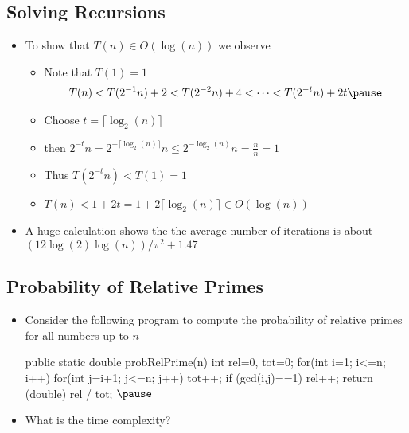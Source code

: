 \begin{slide}
\section[-1]{Solving Recursions}

\begin{PauseHighLight}
  \begin{itemize}
  \item To show that $T(n)\in O(\log(n))$ we observe
    \begin{itemize}
    \item Note that $T(1) = 1$\pause
      \begin{align*}
        T(n) < T(2^{-1}n)+2 < T(2^{-2}n)+4 < \cdots < T(2^{-t}n) + 2t\pause
      \end{align*}
    \item Choose $t=\lceil \log_2(n)  \rceil$
    \item then $2^{-t}n = 2^{-\lceil \log_2(n)  \rceil}n\leq
      2^{-\log_2(n)} n = \frac{n}{n} = 1$\pause 
    \item Thus $T(2^{-t}n)< T(1) = 1$\pause
    \item $T(n) < 1 + 2 t = 1 +  2 \lceil \log_2(n)  \rceil \in
      O(\log(n))$\pause
    \end{itemize}
  \item A huge calculation shows the the average number of iterations is
    about $(12 \log(2) \log(n))/\pi^2 + 1.47$\pause
  \end{itemize}
\end{PauseHighLight}

\end{slide}


\begin{slide}
\section[-1]{Probability of Relative Primes}

\begin{PauseHighLight}
  \begin{itemize}
  \item Consider the following program to compute the probability of
    relative primes for all numbers up to $n$
\begin{java}
public static double probRelPrime(n)
{
  int rel=0, tot=0;
  for(int i=1; i<=n; i++)
     for(int j=i+1; j<=n; j++) {
       tot++;
       if (gcd(i,j)==1)
          rel++;
     }
  return (double) rel / tot;
} $\pause$
\end{java}
\item What is the time complexity?\pause
  \end{itemize}
\end{PauseHighLight}

\end{slide}

